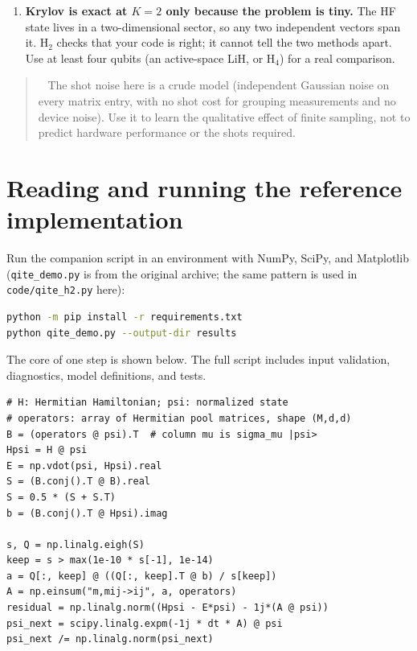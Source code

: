 \documentclass[11pt,a4paper]{article}
\newcommand{\Eh}{E_{\mathrm h}}
\newcommand{\lesson}[2]{\clearpage\section{#1}\label{#2}}
\newenvironment{caution}[1][Important distinction]{\par\smallskip\begin{quotation}\noindent{\bfseries\textcolor{alertred}{#1.}}\ }{\end{quotation}\smallskip}
\begin{document}
\begin{enumerate}
\begin{center}
\begin{tabular}{@{}lrrr@{}}
$10^{5}$ & $0.029$ & $1.5\times10^{-4}$ & $1.4\times10^{-4}\,\Eh$\\\bottomrule
\end{tabular}
\end{center}
An $\epsilon$ that is small compared with the noise level ($\approx1/\sqrt N=0.03$ at $10^3$ shots) is useless; one a few times larger recovers stability. In this example the averages are dominated by a few bad runs (heavy-tailed), so always report many repetitions and the spread, not a single curve. A too-large $\epsilon$ would instead slow the progress, so $\epsilon$ is a tuning knob that must be chosen on a simulator before hardware.
\item \textbf{Krylov is exact at $K=2$ only because the problem is tiny.} The HF state lives in a two-dimensional sector, so any two independent vectors span it. $\mathrm{H}_2$ checks that your code is right; it cannot tell the two methods apart. Use at least four qubits (an active-space LiH, or $\mathrm{H}_4$) for a real comparison.
\end{enumerate}

\begin{caution}[Limits of this emulation]
The shot noise here is a crude model (independent Gaussian noise on every matrix entry, with no shot cost for grouping measurements and no device noise). Use it to learn the qualitative effect of finite sampling, not to predict hardware performance or the shots required.
\end{caution}

\lesson{Reading and running the reference implementation}{sec:code}
Run the companion script in an environment with NumPy, SciPy, and Matplotlib (\texttt{qite\_demo.py} is from the original archive; the same pattern is used in \texttt{code/qite\_h2.py} here):
\begin{lstlisting}[language=bash]
python -m pip install -r requirements.txt
python qite_demo.py --output-dir results
\end{lstlisting}
The core of one step is shown below. The full script includes input validation, diagnostics, model definitions, and tests.
\begin{lstlisting}
# H: Hermitian Hamiltonian; psi: normalized state
# operators: array of Hermitian pool matrices, shape (M,d,d)
B = (operators @ psi).T  # column mu is sigma_mu |psi>
Hpsi = H @ psi
E = np.vdot(psi, Hpsi).real
S = (B.conj().T @ B).real
S = 0.5 * (S + S.T)
b = (B.conj().T @ Hpsi).imag

s, Q = np.linalg.eigh(S)
keep = s > max(1e-10 * s[-1], 1e-14)
a = Q[:, keep] @ ((Q[:, keep].T @ b) / s[keep])
A = np.einsum("m,mij->ij", a, operators)
residual = np.linalg.norm((Hpsi - E*psi) - 1j*(A @ psi))
psi_next = scipy.linalg.expm(-1j * dt * A) @ psi
psi_next /= np.linalg.norm(psi_next)
\end{lstlisting}
\end{document}
